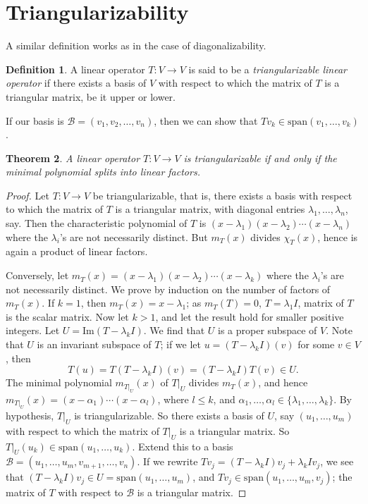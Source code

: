 \documentclass[15pt,a4paper]{book}
\newtheorem{theorem}{Theorem}[chapter]
\theoremstyle{definition}
\newtheorem{definition}[theorem]{Definition}
\newcommand{\eax}[1]{\emph{#1}\index{#1}} %
\newcommand{\mc}[1]{\mathcal{#1}}
\begin{document}
\section{Triangularizability}
A similar definition works as in the case of diagonalizability.
\begin{definition}
    A linear operator $T: V \to V$ is said to be a \eax{triangularizable linear operator} if there exists a basis of $V$ with respect to which the matrix of $T$ is a triangular matrix, be it upper or lower.
\end{definition}
If our basis is $\mc{B} = (v_{1},v_{2},\ldots,v_{n})$, then we can show that $Tv_{k} \in \text{span}(v_{1},\ldots,v_{k})$.

\begin{theorem}
    A linear operator $T: V \to V$ is triangularizable if and only if the minimal polynomial splits into linear factors.
\end{theorem}
\begin{proof}
    Let $T:V \to V$ be triangularizable, that is, there exists a basis with respect to which the matrix of $T$ is a triangular matrix, with diagonal entries $\lambda_{1}, \ldots, \lambda_{n}$, say. Then the characteristic polynomial of $T$ is $(x-\lambda_{1})(x-\lambda_{2}) \cdots (x-\lambda_{n})$ where the $\lambda_{i}$'s are not necessarily distinct. But $m_{T}(x)$ divides $\chi_{T}(x)$, hence is again a product of linear factors.

    Conversely, let $m_{T}(x) = (x-\lambda_{1})(x-\lambda_{2}) \cdots (x-\lambda_{k})$ where the $\lambda_{i}$'s are not necessarily distinct. We prove by induction on the number of factors of $m_{T}(x)$. If $k = 1$, then $m_{T}(x) = x-\lambda_{1}$; as $m_{T}(T) = 0$, $T = \lambda_{1}I$, matrix of $T$ is the scalar matrix. Now let $k > 1$, and let the result hold for smaller positive integers. Let $U = \text{Im} (T-\lambda_{k}I)$. We find that $U$ is a proper subspace of $V$. Note that $U$ is an invariant subspace of $T$; if we let $u = (T-\lambda_{k}I)(v)$ for some $v \in V$, then
    \begin{equation}
        T(u) = T(T-\lambda_{k}I)(v) = (T-\lambda_{k}I)T(v) \in U.
    \end{equation}
    The minimal polynomial $m_{T|_{U}}(x)$ of $T|_{U}$ divides $m_{T}(x)$, and hence $m_{T|_{U}}(x) = (x-\alpha_{1}) \cdots (x-\alpha_{l})$, where $l \leq k$, and $\alpha_{1},\ldots,\alpha_{l} \in \{\lambda_{1},\ldots,\lambda_{k}\}$. By hypothesis, $T|_{U}$ is triangularizable. So there exists a basis of $U$, say $(u_{1},\ldots,u_{m})$ with respect to which the matrix of $T|_{U}$ is a triangular matrix. So $T|_{U}(u_{k}) \in \text{span}(u_{1},\ldots,u_{k})$. Extend this to a basis $\mc{B} = (u_{1},\ldots,u_{m},v_{m+1},\ldots,v_{n})$. If we rewrite $Tv_{j} = (T-\lambda_{k}I)v_{j} + \lambda_{k}Iv_{j}$, we see that $(T-\lambda_{k}I)v_{j} \in U = \text{span}(u_{1},\ldots,u_{m})$, and $Tv_{j} \in \text{span}(u_{1},\ldots,u_{m},v_{j})$; the matrix of $T$ with respect to $\mc{B}$ is a triangular matrix. 
\end{proof}
\end{document}
